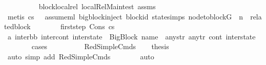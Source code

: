 \begin{isabellebody}
\ \ \ \ \ \ \ \ \isamarkupfalse%
\ block{\isacharunderscore}{\kern0pt}local{\isacharunderscore}{\kern0pt}rel\ local{\isachardot}{\kern0pt}Rel{\isacharunderscore}{\kern0pt}Main{\isacharunderscore}{\kern0pt}test\ assms{\isacharparenleft}{\kern0pt}{}{\isacharparenright}{\kern0pt}\ \isanewline
\ \ \ \ \ \ \ \ \isamarkupfalse%
\ {\isacharparenleft}{\kern0pt}metis\ {\isacartoucheopen}cs{}\ {\isasymnoteq}\ {\isacharbrackleft}{\kern0pt}{\isacharbrackright}{\kern0pt}{\isacartoucheclose}\ assume{\isacharunderscore}{\kern0pt}ml\ bigblock{\isachardot}{\kern0pt}inject\ block{\isacharunderscore}{\kern0pt}id\ state{\isachardot}{\kern0pt}simps{\isacharparenleft}{\kern0pt}{}{\isacharparenright}{\kern0pt}\ {\isacartoucheopen}node{\isacharunderscore}{\kern0pt}to{\isacharunderscore}{\kern0pt}block{\isacharparenleft}{\kern0pt}G{\isacharparenright}{\kern0pt}\ {\isacharbang}{\kern0pt}\ n\ {\isacharequal}{\kern0pt}\ related{\isacharunderscore}{\kern0pt}block{\isacartoucheclose}{\isacharparenright}{\kern0pt}\isanewline
\isanewline
\ \ \ \ \ \ \isamarkupfalse%
\ first{\isacharunderscore}{\kern0pt}step\ Cons\ {\isacartoucheopen}cs{}\ {\isasymnoteq}\ {\isacharbrackleft}{\kern0pt}{\isacharbrackright}{\kern0pt}{\isacartoucheclose}\isanewline
\ \ \ \ \ \ \isamarkupfalse%
\ a{}{\isacharcolon}{\kern0pt}\ {\isachardoublequoteopen}{\isacharparenleft}{\kern0pt}inter{\isacharunderscore}{\kern0pt}bb{\isacharcomma}{\kern0pt}\ inter{\isacharunderscore}{\kern0pt}cont{\isacharcomma}{\kern0pt}\ inter{\isacharunderscore}{\kern0pt}state{\isacharparenright}{\kern0pt}\ {\isacharequal}{\kern0pt}\ {\isacharparenleft}{\kern0pt}{\isacharparenleft}{\kern0pt}BigBlock\ name\ {\isacharbrackleft}{\kern0pt}{\isacharbrackright}{\kern0pt}\ any{\isacharunderscore}{\kern0pt}str\ any{\isacharunderscore}{\kern0pt}tr{\isacharparenright}{\kern0pt}{\isacharcomma}{\kern0pt}\ cont{}{\isacharcomma}{\kern0pt}\ inter{\isacharunderscore}{\kern0pt}state{\isacharparenright}{\kern0pt}{\isachardoublequoteclose}\isanewline
\ \ \ \ \ \ \isamarkupfalse%
\ cases\isanewline
\ \ \ \ \ \ \ \ \isamarkupfalse%
\ RedSimpleCmds\ \isamarkupfalse%
\ \isamarkupfalse%
\ {\isacharquery}{\kern0pt}thesis\ \isamarkupfalse%
\ {\isacharparenleft}{\kern0pt}auto\ simp\ add{\isacharcolon}{\kern0pt}\ RedSimpleCmds{\isacharparenright}{\kern0pt}\isanewline
\ \ \ \ \ \ \isamarkupfalse%
\ auto\isanewline

\end{isabellebody}
